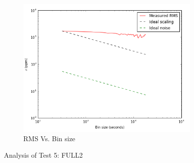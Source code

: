 \documentclass[conference]{IEEEtran}
\begin{document}
\begin{figure}[H]
    \begin{subfigure}{3}
        \includegraphics[scale=0.6]{rms_test5}
        \caption{RMS Vs. Bin size}
    \end{subfigure}
    \caption{Analysis of Test 5: FULL2}
\end{figure}
\end{document}
